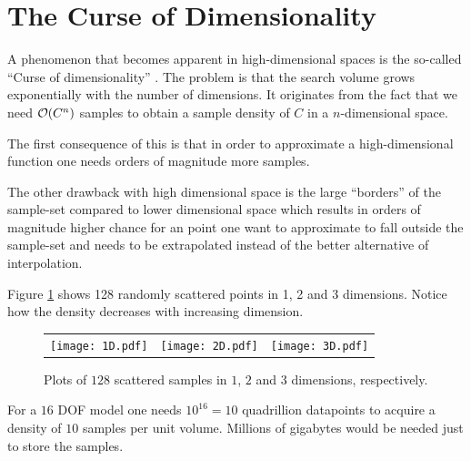 \section{The Curse of Dimensionality} A phenomenon that becomes
apparent in high-dimensional spaces is the so-called ``Curse of
dimensionality'' \cite{EncyclopediaMachineLearning}.  The problem is
that the search volume grows exponentially with the number of
dimensions.  It originates from the fact that we need $\mathcal{O}{\left(C^n\right)}$
samples to obtain a sample density of $C$ in a $n$-dimensional space.

The first consequence of this is that in order to approximate a
high-dimensional function one needs orders of magnitude more samples.

The other drawback with high dimensional space is the large
``borders'' of the sample-set compared to lower dimensional space
which results in orders of magnitude higher chance for an point one
want to approximate to fall outside the sample-set and needs to be
extrapolated instead of the better alternative of interpolation.


\begin{example} Figure \ref{fig:curse-of-dimensionality} shows 128
randomly scattered points in 1, 2 and 3 dimensions. Notice how the
density decreases with increasing dimension.
  \begin{figure}
    \begin{tabular}{rcl}
      \texttt{[image: 1D.pdf]}&
      \texttt{[image: 2D.pdf]}&
      \texttt{[image: 3D.pdf]}
    \end{tabular}
    \caption{Plots of $128$ scattered samples in $1$, $2$ and $3$
dimensions, respectively.}
    \label{fig:curse-of-dimensionality}
  \end{figure}
\end{example}

\begin{example} For a $16$ DOF model one needs $10^{16}=10$
quadrillion datapoints to acquire a density of $10$ samples per unit
volume. Millions of gigabytes would be needed just to store the
samples.
\end{example}

